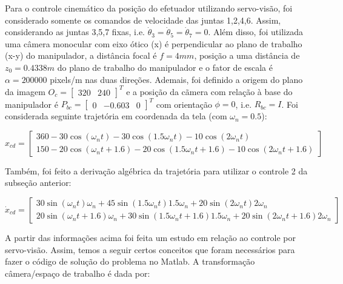 \documentclass[10pt]{article}
\begin{document}
Para o controle cinemático da posição do efetuador utilizando servo-visão,
foi considerado somente os comandos de velocidade das juntas {1,2,4,6}.
Assim, considerando as juntas {3,5,7} fixas, i.e. $\dot{\theta}_3 = \dot{\theta}_5 = \dot{\theta}_7 = 0$.
Além disso, foi utilizada uma câmera monocular com eixo ótico (x) é perpendicular ao plano de trabalho (x-y) do manipulador,
a distância focal é $f=4mm$, posição a uma distância de $z_0=0.4338m$ do plano de trabalho do manipulador e
o fator de escala é $\alpha = 200000$ pixels/m nas duas direções.
Ademais, foi definido a origem do plano da imagem $O_c = \begin{bmatrix} 320 & 240 \end{bmatrix}^T$ e 
a posição da cãmera com relação à base do manipulador é $P_{bc} = \begin{bmatrix} 0 & -0.603 & 0 \end{bmatrix}^T$
com orientação $\phi = 0$, i.e. $R_{bc} = I$. Foi considerada seguinte trajetória em coordenada da tela (com $\omega_n = 0.5$):

\begin{equation}
    x_{cd} = \begin{bmatrix}
        360 - 30 \cos(\omega_n t) - 30 \cos(1.5 \omega_n t) - 10 \cos(2 \omega_n t) \\
        150 - 20 \cos(\omega_n t + 1.6) - 20 \cos(1.5 \omega_n t + 1.6) - 10 \cos(2 \omega_n t + 1.6)
    \end{bmatrix}
\end{equation}

Também, foi feito a derivação algébrica da trajetória para utilizar o controle 2 da subseção anterior:

\begin{equation}
    \dot{x}_{cd} = \begin{bmatrix}
        30 \sin(\omega_n t) \omega_n + 45 \sin(1.5 \omega_n t) 1.5 \omega_n + 20 \sin(2 \omega_n t) 2 \omega_n \\
        20 \sin(\omega_n t + 1.6) \omega_n + 30 \sin(1.5 \omega_n t + 1.6) 1.5 \omega_n + 20 \sin(2 \omega_n t + 1.6) 2 \omega_n
    \end{bmatrix}
\end{equation}

A partir das informações acima foi feita um estudo em relação ao controle por servo-visão.
Assim, temos a seguir certos conceitos que foram necessários para fazer o código de solução do problema no Matlab.
A transformação câmera/espaço de trabalho é dada por:
\end{document}
